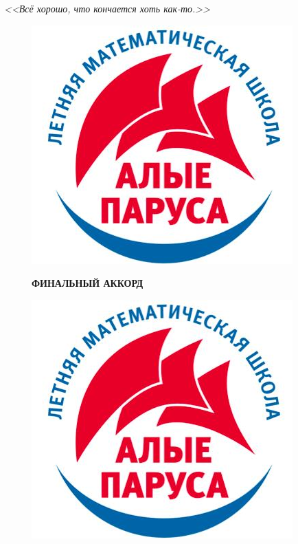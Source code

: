 \documentclass[12 pt, a4paper]{article}%
\begin{document}
	\newpage
	\begin{flushright}
		\textit{<<Всё хорошо, что кончается хоть как-то.>>}
	\end{flushright}
	\begin{figure}[t]
		\begin{minipage}[h]{0.33\linewidth}
			\includegraphics[width=0.33\linewidth, left]{logo.jpg}
		\end{minipage}
		\begin{minipage}[h]{0.33\linewidth}
			\centering
			\large{\textbf{ФИНАЛЬНЫЙ АККОРД}}\\
		\end{minipage}
		\begin{minipage}[h]{0.33\linewidth}
			\includegraphics[width=0.33\linewidth, right]{logo.jpg}
		\end{minipage}
		\label{ris:image1}
	\end{figure}
	
\end{document}
